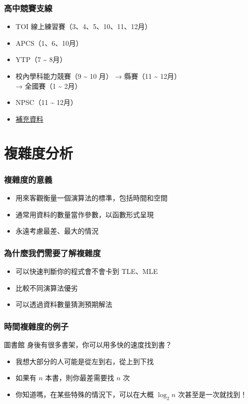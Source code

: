 \documentclass[mathserif]{beamer}
\begin{document}
\begin{frame}
    \frametitle{高中競賽支線}
    \begin{itemize}
        \item TOI 線上練習賽（3、4、5、10、11、12月）
        \item APCS（1、6、10月）
        \item YTP（7 \~{} 8月）
        \item 校內學科能力競賽（9 \~{} 10 月） → 縣賽（11 \~{} 12月）\\
        → 全國賽（1 \~{} 2月）
        \item NPSC（11 \~{} 12月）
        \vspace{0.5cm}
        \item \href{https://github.com/goodjack/awesome-cs-training}{補充資料}
    \end{itemize}
\end{frame}

\section{複雜度分析}

\begin{frame}
    \frametitle{複雜度的意義}
    \begin{itemize}
        \item 用來客觀衡量一個演算法的標準，包括時間和空間
        \item 通常用資料的數量當作參數，以函數形式呈現
        \item 永遠考慮最差、最大的情況
    \end{itemize}
\end{frame}

\begin{frame}
    \frametitle{為什麼我們需要了解複雜度}
    \begin{itemize}
        \item 可以快速判斷你的程式會不會卡到 TLE、MLE
        \item 比較不同演算法優劣
        \item 可以透過資料數量猜測預期解法
    \end{itemize}
\end{frame}

\begin{frame}
    \frametitle{時間複雜度的例子}
    \begin{block}{圖書館}
        身後有很多書架，你可以用多快的速度找到書？
    \end{block}
    \begin{itemize}
        \item<2-> 我想大部分的人可能是從左到右，從上到下找
        \item<2-> 如果有 $n$ 本書，則你最差需要找 $n$ 次
        \item<3-> 你知道嗎，在某些特殊的情況下，可以在大概 $\log_2{n}$ 次甚至是一次就找到！
    \end{itemize}
\end{frame}
\end{document}
